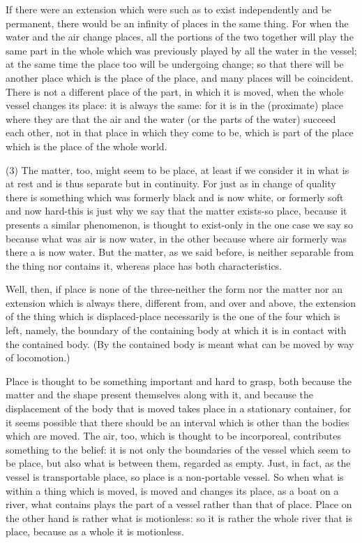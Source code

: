 If there were an extension which were such as to exist independently
and be permanent, there would be an infinity of places in the same
thing. For when the water and the air change places, all the portions
of the two together will play the same part in the whole which was
previously played by all the water in the vessel; at the same time
the place too will be undergoing change; so that there will be another
place which is the place of the place, and many places will be coincident.
There is not a different place of the part, in which it is moved,
when the whole vessel changes its place: it is always the same: for
it is in the (proximate) place where they are that the air and the
water (or the parts of the water) succeed each other, not in that
place in which they come to be, which is part of the place which is
the place of the whole world. 

(3) The matter, too, might seem to be place, at least if we consider
it in what is at rest and is thus separate but in continuity. For
just as in change of quality there is something which was formerly
black and is now white, or formerly soft and now hard-this is just
why we say that the matter exists-so place, because it presents a
similar phenomenon, is thought to exist-only in the one case we say
so because what was air is now water, in the other because where air
formerly was there a is now water. But the matter, as we said before,
is neither separable from the thing nor contains it, whereas place
has both characteristics. 

Well, then, if place is none of the three-neither the form nor the
matter nor an extension which is always there, different from, and
over and above, the extension of the thing which is displaced-place
necessarily is the one of the four which is left, namely, the boundary
of the containing body at which it is in contact with the contained
body. (By the contained body is meant what can be moved by way of
locomotion.) 

Place is thought to be something important and hard to grasp, both
because the matter and the shape present themselves along with it,
and because the displacement of the body that is moved takes place
in a stationary container, for it seems possible that there should
be an interval which is other than the bodies which are moved. The
air, too, which is thought to be incorporeal, contributes something
to the belief: it is not only the boundaries of the vessel which seem
to be place, but also what is between them, regarded as empty. Just,
in fact, as the vessel is transportable place, so place is a non-portable
vessel. So when what is within a thing which is moved, is moved and
changes its place, as a boat on a river, what contains plays the part
of a vessel rather than that of place. Place on the other hand is
rather what is motionless: so it is rather the whole river that is
place, because as a whole it is motionless. 

